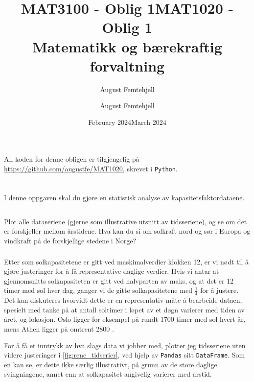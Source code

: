 \documentclass{article}
\title{MAT3100 - Oblig 1}
\author{August Femtehjell}
\date{February 2024}
\title{MAT1020 - Oblig 1\\Matematikk og bærekraftig forvaltning}
\author{August Femtehjell}
\date{March 2024}
\begin{document}
\maketitle

\noindent
All koden for denne obligen er tilgjengelig på \url{https://github.com/augustfe/MAT1020}, skrevet i \verb|Python|.

\section{}
I denne oppgaven skal du gjøre en statistisk analyse av kapasitetsfaktordataene.

\subsection{}
Plot alle dataseriene (gjerne som illustrative utsnitt av tidsseriene), og se om det er forskjeller mellom årstidene. Hva kan du si om solkraft nord og sør i Europa og vindkraft på de forskjellige stedene i Norge?

\subsubsection{}
Etter som solkapasitetene er gitt ved maskimalverdier klokken 12, er vi nødt til å gjøre justeringer for å få representative daglige verdier.
Hvis vi antar at gjennomsnitts solkapasiteten er gitt ved halvparten av maks, og at det er 12 timer med sol hver dag, ganger vi de gitte solkapasitetene med $\frac{1}{4}$ for å justere.
Det kan diskuteres hvorvidt dette er en representativ måte å bearbeide dataen, spesielt med tanke på at antall soltimer i løpet av et døgn varierer med tiden av året, og lokasjon.
Oslo ligger for eksempel på rundt 1700 timer med sol hvert år, mens Athen ligger på omtrent 2800 \cite{soltimer}.

For å få et inntrykk av hva slags data vi jobber med, plotter jeg tidsseriene uten videre justeringer i \autoref{fig:rene_tidserier}, ved hjelp av \verb|Pandas| sitt \verb|DataFrame|.
Som en kan se, er dette ikke særlig illustrativt, på grunn av de store daglige svingningene, annet enn at solkapasitet angivelig varierer med årstid.
\end{document}
